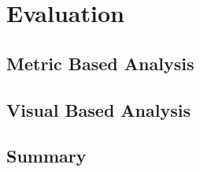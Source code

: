 
\chapter{Evaluation}
\section{Metric Based Analysis}
\section{Visual Based Analysis}
\section{Summary}
